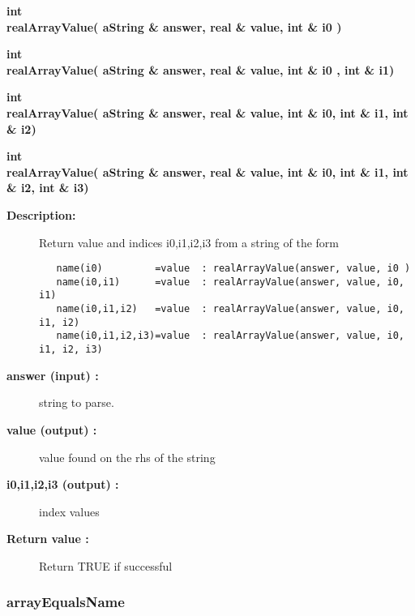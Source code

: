 \begin{flushleft} \textbf{%
int  \\ 
\settowidth{\NameListIncludeArgIndent}{realArrayValue(}%
realArrayValue( aString \& answer, real \& value, int \& i0 )
}\end{flushleft}

 
\begin{flushleft} \textbf{%
int  \\ 
\settowidth{\NameListIncludeArgIndent}{realArrayValue(}%
realArrayValue( aString \& answer, real \& value, int \& i0 , int \& i1)
}\end{flushleft}

 
\begin{flushleft} \textbf{%
int  \\ 
\settowidth{\NameListIncludeArgIndent}{realArrayValue(}%
realArrayValue( aString \& answer, real \& value, int \& i0, int \& i1, int \& i2)
}\end{flushleft}

 
\begin{flushleft} \textbf{%
int  \\ 
\settowidth{\NameListIncludeArgIndent}{realArrayValue(}%
realArrayValue( aString \& answer, real \& value, int \& i0, int \& i1, int \& i2, int \& i3)
}\end{flushleft}
\begin{description}
\item[{\bf Description:}] 
 Return value and indices i0,i1,i2,i3 from a string of the form
 \begin{verbatim}
   name(i0)         =value  : realArrayValue(answer, value, i0 )
   name(i0,i1)      =value  : realArrayValue(answer, value, i0, i1)
   name(i0,i1,i2)   =value  : realArrayValue(answer, value, i0, i1, i2)
   name(i0,i1,i2,i3)=value  : realArrayValue(answer, value, i0, i1, i2, i3)
 \end{verbatim}
\item[{\bf answer (input) :}]  string to parse.
\item[{\bf value (output) :}]  value found on the rhs of the string
\item[{\bf i0,i1,i2,i3 (output) :}]  index values
\item[{\bf Return value :}]   Return TRUE if successful
\end{description}
\subsubsection{arrayEqualsName}
 

